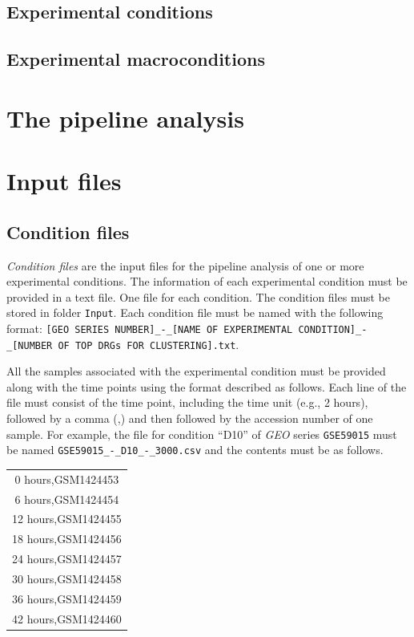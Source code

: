 \documentclass[final,letterpaper,twoside,12pt]{article}
\begin{document}
\subsection{Experimental conditions}

\subsection{Experimental macroconditions}

\section{The pipeline analysis}
\label{section:pipeline}


\section{Input files}
\label{section:input_files}

\subsection{Condition files}
\label{section:condition_files}

\par \emph{Condition files} are the input files for the pipeline analysis of one or more experimental conditions. The information of each experimental condition must be provided in a text file. One file for each condition. The condition files must be stored in folder \texttt{Input}. Each condition file must be named with the following format: \texttt{[GEO SERIES NUMBER]\_-\_[NAME OF EXPERIMENTAL CONDITION]\_-\_[NUMBER OF TOP DRGs FOR CLUSTERING].txt}.

\par All the samples associated with the experimental condition must be provided along with the time points using the format described as follows. Each line of the file must consist of the time point, including the time unit (e.g., 2 hours), followed by a comma (,) and then followed by the accession number of one sample. For example, the file for condition ``D10'' of \textit{GEO} series \texttt{GSE59015} must be named \texttt{GSE59015\_-\_D10\_-\_3000.csv} and the contents must be as follows.

\begin{center}
\begin{tabular}{ c }

0 hours,GSM1424453 \\
6 hours,GSM1424454 \\
12 hours,GSM1424455 \\
18 hours,GSM1424456 \\
24 hours,GSM1424457 \\
30 hours,GSM1424458 \\
36 hours,GSM1424459 \\
42 hours,GSM1424460 \\

\end{tabular}
\end{center}
\end{document}
